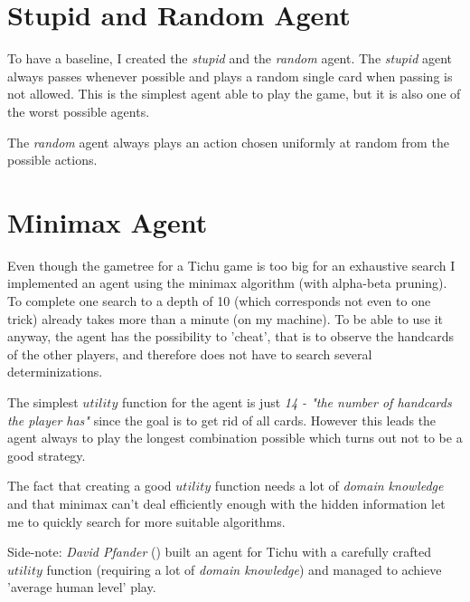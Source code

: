 \section{Stupid and Random Agent}
To have a baseline, I created the \textit{stupid} and the \textit{random} agent.
The \textit{stupid} agent always passes whenever possible and plays a random single card when passing is not allowed. This is the simplest agent able to play the game, but it is also one of the worst possible agents.

The \textit{random} agent always plays an action chosen uniformly at random from the possible actions.


\section{Minimax Agent}
Even though the gametree for a Tichu game is too big for an exhaustive search I implemented an agent using the minimax algorithm (with alpha-beta pruning).
To complete one search to a depth of 10 (which corresponds not even to one trick) already takes more than a minute (on my machine).
To be able to use it anyway, the agent has the possibility to 'cheat', that is to observe the handcards of the other players, and therefore does not have to search several determinizations.

The simplest $utility$ function for the agent is just \textit{14 - "the number of handcards the player has"} since the goal is to get rid of all cards. However this leads the agent always to play the longest combination possible which turns out not to be a good strategy.

The fact that creating a good $utility$ function needs a lot of \textit{domain knowledge} and that minimax can't deal efficiently enough with the hidden information let me to quickly search for more suitable algorithms.

Side-note: \textit{David Pfander} (\cite{david12}) built an agent for Tichu with a carefully crafted $utility$ function (requiring a lot of \textit{domain knowledge}) and managed to achieve 'average human level' play.


